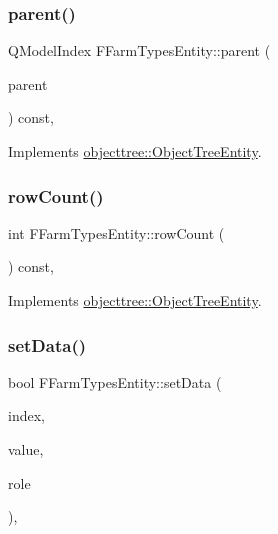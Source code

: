\subsubsection{\texorpdfstring{parent()}{parent()}}
{\footnotesize\ttfamily Q\+Model\+Index F\+Farm\+Types\+Entity\+::parent (\begin{DoxyParamCaption}\item[{const Q\+Model\+Index \&}]{parent }\end{DoxyParamCaption}) const\hspace{0.3cm}{\ttfamily [override]}, {\ttfamily [virtual]}}



Implements \mbox{\hyperlink{classobjecttree_1_1_object_tree_entity_a2d1b13c056476f87637aacd7e99e7305}{objecttree\+::\+Object\+Tree\+Entity}}.

\mbox{\label{classobjecttree_1_1_f_farm_types_entity_a58ee100018ced9ecf7aaef8bf9b56ff1}} 
\subsubsection{\texorpdfstring{rowCount()}{rowCount()}}
{\footnotesize\ttfamily int F\+Farm\+Types\+Entity\+::row\+Count (\begin{DoxyParamCaption}{ }\end{DoxyParamCaption}) const\hspace{0.3cm}{\ttfamily [override]}, {\ttfamily [virtual]}}



Implements \mbox{\hyperlink{classobjecttree_1_1_object_tree_entity_a82c626bb28c55dcfce11cf7ec3368588}{objecttree\+::\+Object\+Tree\+Entity}}.

\mbox{\label{classobjecttree_1_1_f_farm_types_entity_a60e1138f24803cc605c001ae2351d6b8}} 
\subsubsection{\texorpdfstring{setData()}{setData()}}
{\footnotesize\ttfamily bool F\+Farm\+Types\+Entity\+::set\+Data (\begin{DoxyParamCaption}\item[{const Q\+Model\+Index \&}]{index,  }\item[{const Q\+Variant \&}]{value,  }\item[{int}]{role }\end{DoxyParamCaption})\hspace{0.3cm}{\ttfamily [override]}, {\ttfamily [virtual]}}



